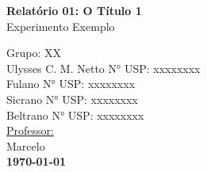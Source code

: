 \documentclass{article}
\begin{document}
\begin{titlepage}
\begin{center}
\begin{figure}[!ht]
			\end{figure}
					
			\vspace{200pt}
			
			\LARGE{\textbf{Relatório 01: O Título 1}}\\ %
			\Large{Experimento Exemplo}\\ %
			
			\vspace{150pt}
			
			\hfill Grupo: XX \\%
			
			\vspace{40pt} %
			\hfill Ulysses C. M. Netto\hspace{20pt} N° USP: xxxxxxxx\\
		    \hfill Fulano \hspace{20pt} N° USP: xxxxxxxx\\
		    \hfill Sicrano \hspace{20pt} N° USP: xxxxxxxx\\
			\hfill Beltrano \hspace{20pt} N° USP: xxxxxxxx\\
			
			\vspace{25pt}
			\hfill \underline{Professor:}\\
			\hfill Marcelo\\ %
			
			
			\vspace{\fill}
			\large\bf{\today}
			
		\end{center}
	\end{titlepage}
	
	
	\newpage
	
	\listoffigures %
	\newpage
	
	\pagestyle{fancy}
	\fancyhead[C]{}
	\fancyfoot[L]{}
	\fancyfoot[C]{\thepage}
	\fancyfoot[R]{}
	\renewcommand{\headrulewidth}{0.4pt}
	\renewcommand{\footrulewidth}{0.4pt}
	
\end{document}
